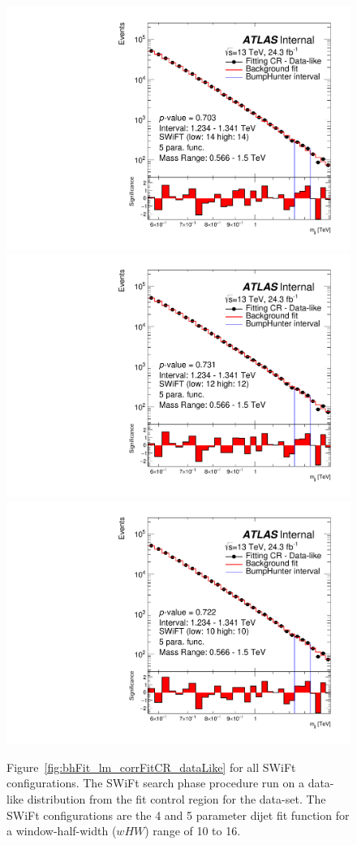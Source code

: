 \begin{figure}[!htb]
{}
 {
  \includegraphics[width=0.3\linewidth, angle=0]{figs/Dibjet/LowMass/FitStudy_min566/bhFit_corrFitCR_dataLike_v13_5para_low14_high14.pdf}
}
 {
  \includegraphics[width=0.3\linewidth, angle=0]{figs/Dibjet/LowMass/FitStudy_min566/bhFit_corrFitCR_dataLike_v13_5para_low12_high12.pdf}
}
 {
  \includegraphics[width=0.3\linewidth, angle=0]{figs/Dibjet/LowMass/FitStudy_min566/bhFit_corrFitCR_dataLike_v13_5para_low10_high10.pdf}
}
\vspace{10pt}
\caption[Figure~\ref{fig:bhFit_lm_corrFitCR_dataLike} for all SWiFt configurations.]
{\label{fig:app-bhFit_lm_corrFitCR_dataLike}
  Figure~\ref{fig:bhFit_lm_corrFitCR_dataLike} for all SWiFt configurations.
  The SWiFt search phase procedure run on a data-like distribution
  from the fit control region for the \lm{} data-set.
  The SWiFt configurations are the 4 and 5 parameter dijet fit function for a window-half-width ($wHW$) range of 10 to 16.
}
\end{figure}

